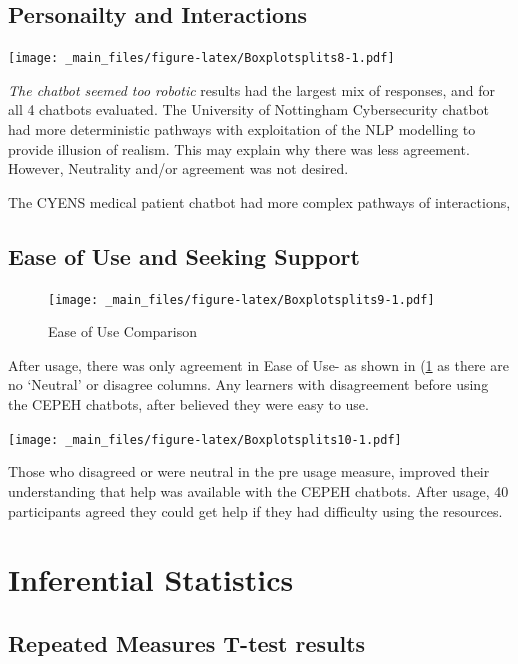 \documentclass[a4paper, nobind]{templates/ociamthesis}
\begin{document}
\hypertarget{personailty-and-interactions}{%
\subsection{Personailty and Interactions}\label{personailty-and-interactions}}

\texttt{[image: \_main\_files/figure-latex/Boxplotsplits8-1.pdf]}

\emph{The chatbot seemed too robotic} results had the largest mix of
responses, and for all 4 chatbots evaluated. The University of
Nottingham Cybersecurity chatbot had more deterministic pathways with
exploitation of the NLP modelling to provide illusion of realism. This
may explain why there was less agreement. However, Neutrality and/or
agreement was not desired.

The CYENS medical patient chatbot had more complex pathways of
interactions,

\hypertarget{ease-of-use-and-seeking-support}{%
\subsection{Ease of Use and Seeking Support}\label{ease-of-use-and-seeking-support}}

\begin{figure}
\centering
\texttt{[image: \_main\_files/figure-latex/Boxplotsplits9-1.pdf]}
\caption{\label{fig:Boxplotsplits9}Ease of Use Comparison}
\end{figure}

After usage, there was only agreement in Ease of Use- as shown in
(\ref{fig:Boxplotsplits9} as there are no `Neutral' or disagree
columns. Any learners with disagreement before using the CEPEH chatbots,
after believed they were easy to use.

\texttt{[image: \_main\_files/figure-latex/Boxplotsplits10-1.pdf]}

Those who disagreed or were neutral in the pre usage measure, improved
their understanding that help was available with the CEPEH chatbots.
After usage, 40 participants agreed they could get help if they had
difficulty using the resources.

\hypertarget{inferential-statistics}{%
\section{Inferential Statistics}\label{inferential-statistics}}

\hypertarget{repeated-measures-t-test-results}{%
\subsection{Repeated Measures T-test results}\label{repeated-measures-t-test-results}}
\end{document}
